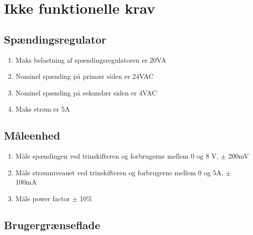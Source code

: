 
\section{Ikke funktionelle krav}

\subsection{Spændingsregulator}
\begin{enumerate}
	\item Maks belastning af spændingsregulatoren er 20VA
	\item Nominel spænding på primær siden er 24VAC
	\item Nominel spænding på sekundær siden er 4VAC
	\item Maks strøm er 5A	
\end{enumerate}

\subsection{Måleenhed}

\begin{enumerate}
	\item Måle spændingen ved trinskifteren og forbrugerne mellem 0 og 8 V, $\pm$ 200mV 
	\item Måle strømniveauet ved trinskifteren og forbrugerne mellem 0 og 5A, $\pm$ 100mA
	\item Måle power factor $\pm$ 10$\%$
\end{enumerate}

\subsection{Brugergrænseflade}

